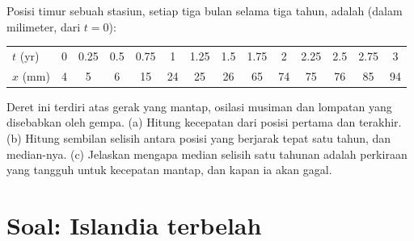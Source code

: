 \begin{exercise}[$\star\star\star$]\label{exo:b1:plate-kinematics:12}
Posisi timur sebuah stasiun, setiap tiga bulan selama tiga tahun, adalah
(dalam milimeter, dari $t = 0$):
\begin{center}\small
\begin{tabular}{l*{13}{c}}
\hline
$t$ (yr) & 0 & 0.25 & 0.5 & 0.75 & 1 & 1.25 & 1.5 & 1.75 & 2 & 2.25 & 2.5 & 2.75 & 3\\
$x$ (mm) & 4 & 5 & 6 & 15 & 24 & 25 & 26 & 65 & 74 & 75 & 76 & 85 & 94\\
\hline
\end{tabular}
\end{center}
Deret ini terdiri atas gerak yang mantap, osilasi musiman dan lompatan yang disebabkan oleh gempa. (a) Hitung kecepatan dari posisi pertama dan terakhir. (b) Hitung sembilan selisih antara posisi yang berjarak tepat satu tahun, dan median-nya. (c) Jelaskan mengapa median selisih satu tahunan adalah perkiraan yang tangguh untuk kecepatan mantap, dan kapan ia akan gagal.
\end{exercise}

\section{Soal: Islandia terbelah}

